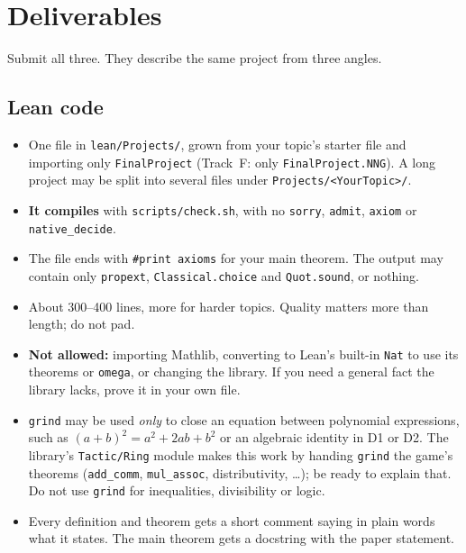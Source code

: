 \documentclass[11pt]{article}
\newcommand{\lean}[1]{\texttt{#1}}
\begin{document}
\section{Deliverables}

Submit all three. They describe the same project from three angles.

\subsection{Lean code}\label{sec:code}
\begin{itemize}
\item One file in \lean{lean/Projects/}, grown from your topic's starter file and importing
  only \lean{FinalProject} (Track~F: only \lean{FinalProject.NNG}). A long project may be split into several files under
  \lean{Projects/<YourTopic>/}.
\item \textbf{It compiles} with \lean{scripts/check.sh}, with no \lean{sorry}, \lean{admit},
  \lean{axiom} or \lean{native\_decide}.
\item The file ends with \lean{\#print axioms} for your main theorem. The output may contain only
  \lean{propext}, \lean{Classical.choice} and \lean{Quot.sound}, or nothing.
\item About 300--400 lines, more for harder topics. Quality matters more than length; do not pad.
\item \textbf{Not allowed:} importing Mathlib, converting to Lean's built-in \lean{Nat} to use its
  theorems or \lean{omega}, or changing the library. If you need a general fact the library
  lacks, prove it in your own file.
\item \lean{grind} may be used \emph{only} to close an equation between polynomial expressions,
  such as $(a+b)^2 = a^2 + 2ab + b^2$ or an algebraic identity in D1 or D2. The library's
  \lean{Tactic/Ring} module makes this work by handing \lean{grind} the game's theorems
  (\lean{add\_comm}, \lean{mul\_assoc}, distributivity, \dots); be ready to explain that. Do not
  use \lean{grind} for inequalities, divisibility or logic.
\item Every definition and theorem gets a short comment saying in plain words what it states.
  The main theorem gets a docstring with the paper statement.
\end{itemize}
\end{document}
